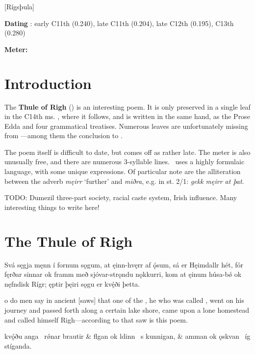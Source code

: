 [Rígsþula]
\def\thisBookCode{Rigsthula}

\begin{flushright}%
\textbf{Dating} \parencite{Sapp2022}: early C11th (0.240), late C11th (0.204), late C12th (0.195), C13th (0.280)

\textbf{Meter:} \Fornyrdislag%
\end{flushright}

\section{Introduction}

The \textbf{Thule of Righ} (\Rigsthula) is an interesting poem.  It is only preserved in a single leaf in the C14th ms. \Wormianus, where it follows, and is written in the same hand, as the Prose Edda and four grammatical treatises.  Numerous leaves are unfortunately missing from \Wormianus—among them the conclusion to \Rigsthula.

The poem itself is difficult to date, but comes off as rather late.  The meter is also unusually free, and there are numerous 3-syllable lines.  \Rigsthula\ uses a highly formulaic language, with some unique expressions.  Of particular note are the alliteration between the adverb \emph{męirr} ‘further’ and \emph{miðra}, e.g. in st. 2/1: \emph{gekk męirr at þat}.

TODO: Dumezil three-part society, racial caste system, Irish influence. Many interesting things to write here!

\section{The Thule of Righ}%

\bpg\bpa{}%
Svá sęgja męnn í fornum sǫgum, at ęinn-hvęrr af ǫ́sum, sá er Hęimdallr hét, fór fęrðar sinnar ok framm með sjóvar-strǫndu nǫkkurri, kom at ęinum húsa-bǿ ok nęfndisk Rígr; ęptir þęiri sǫgu er kvę́ði þetta.\epa

o do men say in ancient [saws] that one of the , he who was called , went on his journey and passed forth along a certain lake shore, came upon a lone homestead and called himself Righ—according to that saw is this poem.\epb\epg


\bvg\bva{}%
 kvǫ́ðu anga \hld\ rǿnar brautir &
flgan ok ldinn \hld\ s kunnigan, &
amman ok ǫskvan \hld\ íg stíganda.\eva

